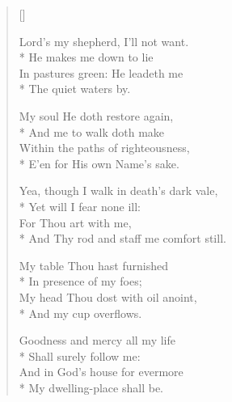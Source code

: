 \newHymn
{}

\begin{verse}[\versewidth]
\begin{altverse}
 Lord's my shepherd, I'll not want.\\*
He makes me down to lie\\
In pastures green: He leadeth me \\*
The quiet waters by.
\end{altverse}

\begin{altverse}
My soul He doth restore again,\\*
And me to walk doth make\\
Within the paths of righteousness,\\*
E'en for His own Name's sake.
\end{altverse}

\begin{altverse}
Yea, though I walk in death's dark vale,\\*
Yet will I fear none ill:\\
For Thou art with me,\\*
And Thy rod and staff me comfort still.
\end{altverse}

\begin{altverse}
My table Thou hast furnished\\*
In presence of my foes;\\
My head Thou dost with oil anoint,\\*
And my cup overflows.
\end{altverse}

\begin{altverse}
Goodness and mercy all my life\\*
Shall surely follow me:\\
And in God's house for evermore\\*
My dwelling-place shall be.

\end{altverse}
\end{verse}

